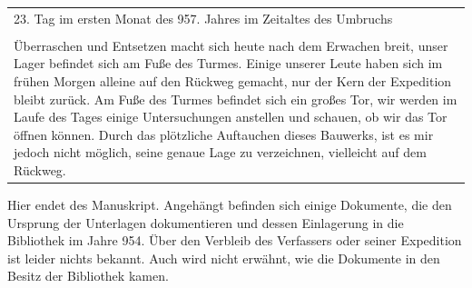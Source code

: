 \begin{longtable}{|p{15cm}|}
\hline
23. Tag im ersten Monat des 957. Jahres im Zeitaltes des Umbruchs\\
\\
Überraschen und Entsetzen macht sich heute nach dem Erwachen breit, unser Lager befindet sich am 
Fuße des Turmes. Einige unserer Leute haben sich im frühen Morgen alleine auf den Rückweg gemacht, 
nur der Kern der Expedition bleibt zurück. Am Fuße des Turmes befindet sich ein großes Tor, wir 
werden im Laufe des Tages einige Untersuchungen anstellen und schauen, ob wir das Tor öffnen können. 
Durch das plötzliche Auftauchen dieses Bauwerks, ist es mir jedoch nicht möglich, seine genaue Lage zu 
verzeichnen, vielleicht auf dem Rückweg.\\
\hline
\end{longtable}

\par Hier endet des Manuskript. Angehängt befinden sich einige Dokumente, die den Ursprung der Unterlagen 
dokumentieren und dessen Einlagerung in die Bibliothek im Jahre 954. Über den Verbleib des Verfassers 
oder seiner Expedition ist leider nichts bekannt. Auch wird nicht erwähnt, wie die Dokumente in den 
Besitz der Bibliothek kamen.
